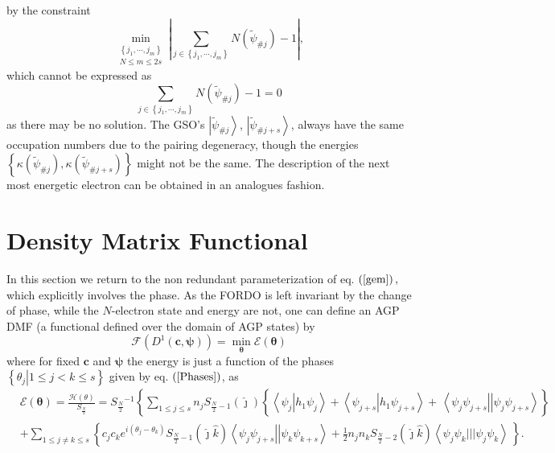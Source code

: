 \documentclass[aps,preprint]{revtex4}%
\begin{document}
by the constraint
\begin{equation}
\min_{\substack{\left\{  j_{1},\cdots,j_{m}\right\}  \\N\leq m\leq
2s}}\left\vert \sum_{j\in\left\{  j_{1},\cdots,j_{m}\right\}  }N\left(
\tilde{\psi}_{\#j}\right)  -1\right\vert , \label{con}%
\end{equation}
which cannot be expressed as
\begin{equation}
\sum_{j\in\left\{  j_{1},\cdots,j_{m}\right\}  }N\left(  \tilde{\psi}%
_{\#j}\right)  -1=0
\end{equation}
as there may be no solution. The GSO's $\left\vert \tilde{\psi}_{\#j}%
\right\rangle $, $\left\vert \tilde{\psi}_{\#j+s}\right\rangle $, always have
the same occupation numbers due to the pairing degeneracy, though the energies
$\left\{  \kappa\left(  \tilde{\psi}_{\#j}\right)  ,\kappa\left(  \tilde{\psi
}_{\#j+s}\right)  \right\}  $ might not be the same. The description of the
next most energetic electron can be obtained in an analogues fashion.

\section{Density Matrix Functional\label{DenMatFun}}

In this section we return to the non redundant parameterization of eq.
$\left(  \ref{gem}\right)  ,$ which explicitly involves the phase. As the
FORDO is left invariant by the change of phase, while the $N$-electron state
and energy are not, one can define an AGP DMF (a functional defined over the
domain of AGP states) by%
\begin{equation}
\mathcal{F}\left(  D^{1}\left(  \boldsymbol{c},\boldsymbol{\psi}\right)
\right)  =\min_{\boldsymbol{\theta}}\mathcal{E}\left(  \boldsymbol{\theta
}\right)
\end{equation}
where for fixed $\boldsymbol{c}$ and $\boldsymbol{\psi}$ the energy is just a
function of the phases $\left\{  \left.  \theta_{j}\right\vert 1\leq j<k\leq
s\right\}  $ given by eq. $\left(  \ref{Phases}\right)  $, as
\begin{align}
&  \mathcal{E}\left(  \boldsymbol{\theta}\right)  =\frac{\mathcal{H}\left(
\theta\right)  }{S_{\frac{N}{2}}}=S_{\frac{N}{2}}{}^{-1}\left\{  \sum_{1\leq
j\leq s}n_{j}S_{\frac{N}{2}-1}\left(  \hat{\jmath}\right)  \left\{  \overset
{}{\left\langle \psi_{j}\left\vert h_{1}\psi_{j}\right.  \right\rangle
+\left\langle \psi_{j+s}\left\vert h_{1}\psi_{j+s}\right.  \right\rangle
}+\,\left\langle \psi_{j}\psi_{j+s}\right\vert \left\vert \psi_{j}\psi
_{j+s}\right\rangle \right\}  \right. \nonumber\\
&  +\sum_{1\leq j\neq k\leq s}\left\{  c_{j}c_{k}e^{i\left(  \theta_{j}%
-\theta_{k}\right)  }S_{\frac{N}{2}-1}\left(  \hat{\jmath}\hat{k}\right)
\left\langle \psi_{j}\psi_{j+s}\right\vert \left\vert \psi_{k}\psi
_{k+s}\right\rangle +\frac{1}{2}n_{j}n_{k}S_{\frac{N}{2}-2}\left(  \hat
{\jmath}\hat{k}\right)  \left\langle \psi_{j}\psi_{k}|||\psi_{j}\psi
_{k}\right\rangle \,\overset{}{}\right\}  .
\end{align}
\end{document}
